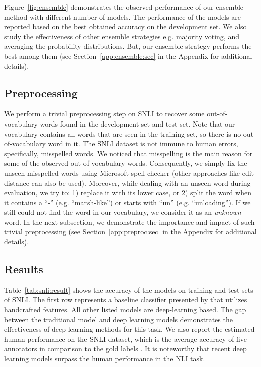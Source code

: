 \documentclass[11pt,a4paper]{article}
\begin{document}
	Figure~\ref{fig:ensemble} demonstrates the observed performance of our ensemble method with different number of models. The performance of the models are reported based on the best obtained accuracy on the development set. We also study the effectiveness of other ensemble strategies e.g. majority voting, and averaging the probability distributions. But, our ensemble strategy performs the best among them (see Section~\ref{app:ensemble:sec} in the Appendix for additional details).
	
	\subsection{Preprocessing}
	We perform a trivial preprocessing step on SNLI to recover some out-of-vocabulary words found in the development set and test set. Note that our vocabulary contains all words that are seen in the training set, so there is no out-of-vocabulary word in it. The SNLI dataset is not immune to human errors, specifically, misspelled words. We noticed that misspelling is the main reason for some of the observed out-of-vocabulary words. Consequently, we simply fix the unseen misspelled words using Microsoft spell-checker (other approaches like edit distance can also be used). Moreover, while dealing with an unseen word during evaluation, we try to: 1) replace it with its lower case, or 2) split the word when it contains a ``-'' (e.g. ``marsh-like'') or starts with ``un'' (e.g. ``unloading''). If we still could not find the word in our vocabulary, we consider it as an \emph{unknown} word. In the next subsection, we demonstrate the importance and impact of such trivial preprocessing (see Section~\ref{app:preproc:sec} in the Appendix for additional details).
	
	\subsection{Results}	
	
	\noindent Table~\ref{tab:snli:result} shows the accuracy of the models on training and test sets of SNLI. The first row represents a baseline classifier presented by \citet{snli} that utilizes handcrafted features. All other listed models are deep-learning based. The gap between the traditional model and deep learning models demonstrates the effectiveness of deep learning methods for this task. We also report the estimated human performance on the SNLI dataset, which is the average accuracy of five annotators in comparison to the gold labels \cite{gong2017}. It is noteworthy that recent deep learning models surpass the human performance in the NLI task.
	
\end{document}
